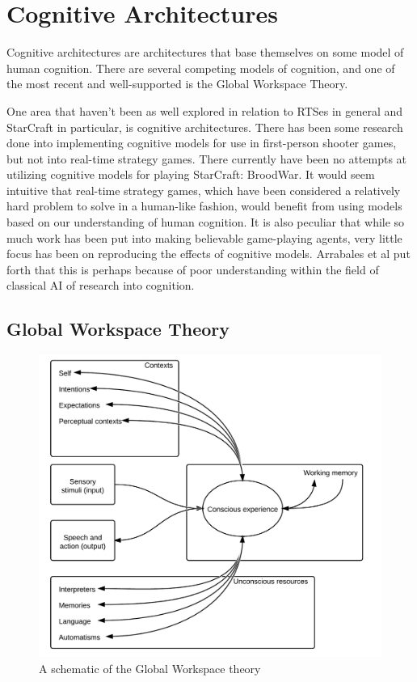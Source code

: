 \section{Cognitive Architectures}
\label{sec:cogarch}
Cognitive architectures are architectures that base themselves on some model of
human cognition. There are several competing models of cognition, and one of
the most recent and well-supported is the Global Workspace Theory.

One area that haven't been as well explored in relation to RTSes in general and
StarCraft in particular, is cognitive architectures.
There has been some research done into implementing cognitive models for use in
first-person shooter games, but not into real-time strategy games. There
currently have been no attempts at utilizing cognitive models for playing
StarCraft: BroodWar. It would seem intuitive that real-time strategy games,
which have been considered a relatively hard problem to solve in a human-like
fashion, would benefit from using models based on our understanding of human
cognition. It is also peculiar that while so much work has been put into making
believable game-playing agents, very little focus has been on reproducing the
effects of cognitive models.  Arrabales et al put forth that this is perhaps
because of poor understanding within the field of classical AI of research into
cognition\cite{arrabales2009gamechars}.

\subsection{Global Workspace Theory}

\begin{figure}[h!tb]
\centering
\includegraphics[scale=1.0]{graphics/globalworkspace.png}
\caption{A schematic of the Global Workspace theory\cite{baars2005gwt}}
\label{fig:gwt}
\end{figure}

